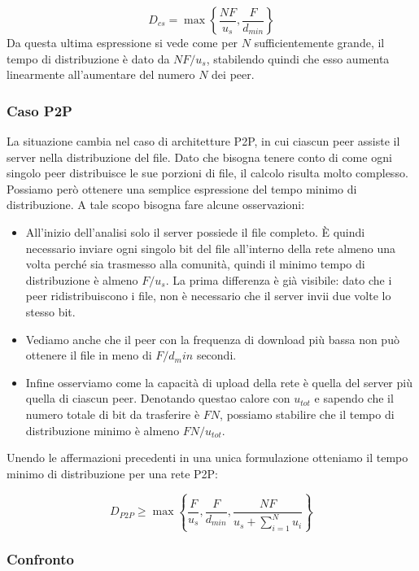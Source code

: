 \[D_{cs} = \max \left\lbrace \frac{NF}{u_s}, \frac{F}{d_{min}} \right\rbrace\]
 Da questa ultima espressione si vede come per $N$ sufficientemente grande, il tempo di distribuzione è dato da $NF/u_s$, stabilendo quindi che esso aumenta linearmente all'aumentare del numero $N$ dei peer.

\subsubsection{Caso P2P}\label{caso-p2p}

La situazione cambia nel caso di architetture P2P, in cui ciascun peer assiste il server nella distribuzione del file. Dato che bisogna tenere conto di come ogni singolo peer distribuisce le sue porzioni di file, il calcolo risulta molto complesso. Possiamo però ottenere una semplice espressione del tempo minimo di distribuzione. A tale scopo bisogna fare alcune osservazioni:

\begin{itemize}
\item
  All'inizio dell'analisi solo il server possiede il file completo. È   quindi necessario inviare ogni singolo bit del file all'interno della   rete almeno una volta perché sia trasmesso alla comunità, quindi il   minimo tempo di distribuzione è almeno $F/u_s$. La prima differenza è   già visibile: dato che i peer ridistribuiscono i file, non è   necessario che il server invii due volte lo stesso bit.
\item
  Vediamo anche che il peer con la frequenza di download più bassa non   può ottenere il file in meno di $F/d_min$ secondi.
\item
  Infine osserviamo come la capacità di upload della rete è quella del   server più quella di ciascun peer. Denotando questao calore con   $u_{tot}$ e sapendo che il numero totale di bit da trasferire è $FN$,   possiamo stabilire che il tempo di distribuzione minimo è almeno   $FN/u_{tot}$.
\end{itemize}

Unendo le affermazioni precedenti in una unica formulazione otteniamo il tempo minimo di distribuzione per una rete P2P:

\[ D_{P2P} \geq \max \left\lbrace \frac{F}{u_s}, \frac{F}{d_{min}}, \frac{NF}{u_s + \sum_{i = 1}^N u_i} \right\rbrace \]

\subsubsection{Confronto}\label{confronto}

